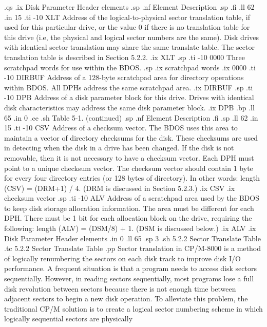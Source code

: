 .qs
.ix Disk Parameter Header elements
.sp
.nf
   Element                       Description
.sp 
.fi
.ll 62
.in 15
.ti -10
XLT       Address of the logical-to-physical sector translation table, if used 
for this particular drive, or the value 0 if there is no translation table 
for this drive (i.e, the physical and logical sector numbers are the same).  
Disk drives with identical sector translation may share the same translate 
table.  The sector translation table is described in Section 5.2.2.
.ix XLT
.sp
.ti -10
0000      Three scratchpad words for use within the BDOS. 
.sp
.ix scratchpad words
.ix 0000
.ti -10
DIRBUF    Address of a 128-byte scratchpad area for directory operations 
within BDOS.  All DPHs address the same scratchpad area.
.ix DIRBUF
.sp
.ti -10
DPB       Address of a disk parameter block for this drive.  Drives with 
identical disk characteristics may address the same disk parameter block.
.ix DPB
.bp
.ll 65
.in 0
.ce
.sh
Table 5-1.  (continued)
.sp
.nf
   Element                       Description
.fi
.sp
.ll 62
.in 15
.ti -10
CSV       Address of a checksum vector.  The BDOS uses this area to maintain 
a vector of directory checksums for the disk.  These checksums are used in 
detecting when the disk in a drive has been changed.  If the disk is not 
removable, then it is not necessary to have a checksum vector.  Each DPH must 
point to a unique checksum vector.  The checksum vector should contain 1 byte 
for every four directory entries (or 128 bytes of directory).  In other words: 
length (CSV) = (DRM+1) / 4.  (DRM is discussed in Section 5.2.3.)
.ix CSV
.ix checksum vector
.sp
.ti -10
ALV       Address of a scratchpad area used by the BDOS to keep disk storage 
allocation information.  The area must be different for each DPH.  There must 
be 1 bit for each allocation block on the drive, requiring the following: 
length (ALV) = (DSM/8) + 1.  (DSM is discussed below.)
.ix ALV
.ix Disk Parameter Header elements
.in 0
.ll 65
.sp 3
.sh
5.2.2  Sector Translate Table
.tc         5.2.2  Sector Translate Table
.pp
Sector translation in CP/M-8000 is a method of logically renumbering
the sectors on each disk track to improve disk I/O performance.  A frequent 
situation is that a program needs to access disk sectors
sequentially.  However, in reading sectors sequentially, most programs
lose a full disk revolution between sectors because there is not
enough time between adjacent sectors to begin a new disk operation.  To 
alleviate this problem, the traditional CP/M solution is to create a logical 
sector numbering scheme in which logically sequential sectors are physically 
